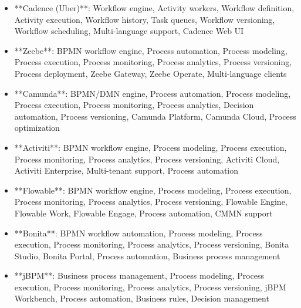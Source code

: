 \documentclass[11pt,a4paper]{article}
\begin{document}
\begin{itemize}
\item **Cadence (Uber)**: Workflow engine, Activity workers, Workflow definition, Activity execution, Workflow history, Task queues, Workflow versioning, Workflow scheduling, Multi-language support, Cadence Web UI
\end{itemize}

\begin{itemize}
\item **Zeebe**: BPMN workflow engine, Process automation, Process modeling, Process execution, Process monitoring, Process analytics, Process versioning, Process deployment, Zeebe Gateway, Zeebe Operate, Multi-language clients
\end{itemize}

\begin{itemize}
\item **Camunda**: BPMN/DMN engine, Process automation, Process modeling, Process execution, Process monitoring, Process analytics, Decision automation, Process versioning, Camunda Platform, Camunda Cloud, Process optimization
\end{itemize}

\begin{itemize}
\item **Activiti**: BPMN workflow engine, Process modeling, Process execution, Process monitoring, Process analytics, Process versioning, Activiti Cloud, Activiti Enterprise, Multi-tenant support, Process automation
\end{itemize}

\begin{itemize}
\item **Flowable**: BPMN workflow engine, Process modeling, Process execution, Process monitoring, Process analytics, Process versioning, Flowable Engine, Flowable Work, Flowable Engage, Process automation, CMMN support
\end{itemize}

\begin{itemize}
\item **Bonita**: BPMN workflow automation, Process modeling, Process execution, Process monitoring, Process analytics, Process versioning, Bonita Studio, Bonita Portal, Process automation, Business process management
\end{itemize}

\begin{itemize}
\item **jBPM**: Business process management, Process modeling, Process execution, Process monitoring, Process analytics, Process versioning, jBPM Workbench, Process automation, Business rules, Decision management
\end{itemize}
\end{document}
